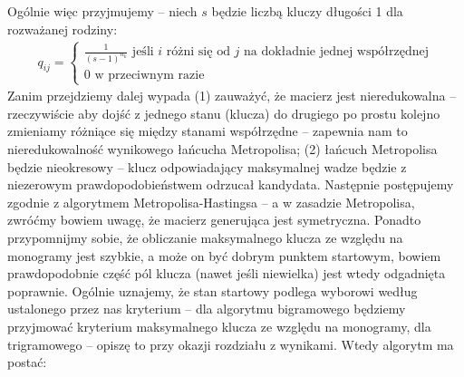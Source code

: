\documentclass[a4paper]{article}
\begin{document}
\begin{center}
\end{center}
Ogólnie więc przyjmujemy – niech $s$ będzie liczbą kluczy długości 1 dla rozważanej rodziny:\\
\begin{align*}
q_{ij} = \begin{cases}
  \frac{1}{(s-1)^{n_k}} \,\, \text{jeśli $i$ różni się od $j$ na dokładnie jednej współrzędnej} \\
  0 \,\, \text{w przeciwnym razie}
\end{cases}
\end{align*}
Zanim przejdziemy dalej wypada (1) zauważyć, że macierz jest nieredukowalna – rzeczywiście aby dojść z jednego stanu (klucza) do drugiego po prostu kolejno zmieniamy różniące się między stanami współrzędne – zapewnia nam to nieredukowalność wynikowego łańcucha Metropolisa; (2) łańcuch Metropolisa będzie nieokresowy – klucz odpowiadający maksymalnej wadze będzie z niezerowym prawdopodobieństwem odrzucał kandydata.
Następnie postępujemy zgodnie z algorytmem Metropolisa-Hastingsa – a w zasadzie Metropolisa, zwróćmy bowiem uwagę, że macierz generująca jest symetryczna. Ponadto przypomnijmy sobie, że obliczanie maksymalnego klucza ze względu na monogramy jest szybkie, a może on być dobrym punktem startowym, bowiem prawdopodobnie część pól klucza (nawet jeśli niewielka) jest wtedy odgadnięta poprawnie. Ogólnie uznajemy, że stan startowy podlega wyborowi według ustalonego przez nas kryterium – dla algorytmu bigramowego będziemy przyjmować kryterium maksymalnego klucza ze względu na monogramy, dla trigramowego – opiszę to przy okazji rozdziału z wynikami. Wtedy algorytm ma postać:\\
\end{document}

